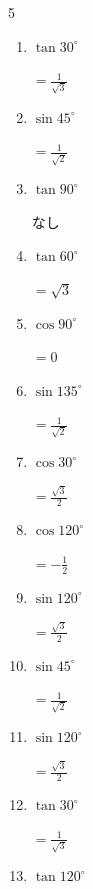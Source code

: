 \begin{multicols}{5}
\begin{enumerate}
        $\displaystyle =-1$

  \item $\displaystyle \tan{30^\circ}$

        $\displaystyle =\frac{1}{\sqrt{3}}$

  \item $\displaystyle \sin{45^\circ}$

        $\displaystyle =\frac{1}{\sqrt{2}}$

  \item $\displaystyle \tan{90^\circ}$

        $\displaystyle なし$

  \item $\displaystyle \tan{60^\circ}$

        $\displaystyle =\sqrt{3}$

  \item $\displaystyle \cos{90^\circ}$

        $\displaystyle =0$

  \item $\displaystyle \sin{135^\circ}$

        $\displaystyle =\frac{1}{\sqrt{2}}$

  \item $\displaystyle \cos{30^\circ}$

        $\displaystyle =\frac{\sqrt{3}}{2}$

  \item $\displaystyle \cos{120^\circ}$

        $\displaystyle =-\frac{1}{2}$

  \item $\displaystyle \sin{120^\circ}$

        $\displaystyle =\frac{\sqrt{3}}{2}$

  \item $\displaystyle \sin{45^\circ}$

        $\displaystyle =\frac{1}{\sqrt{2}}$

  \item $\displaystyle \sin{120^\circ}$

        $\displaystyle =\frac{\sqrt{3}}{2}$

\columnbreak %

\resetques

  \item $\displaystyle \tan{30^\circ}$

        $\displaystyle =\frac{1}{\sqrt{3}}$

  \item $\displaystyle \tan{120^\circ}$


\end{enumerate}
\end{multicols}

